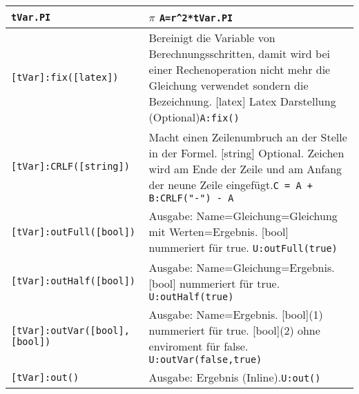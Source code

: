 \begin{table}[h]
	\begin{tabular}{|p{}|p{}|}
		\hline
		\lstinline{tVar.PI} & $\pi$  \newline \lstinline!A=r^2*tVar.PI!\\
		\hline
		\lstinline{[tVar]:fix([latex])} & Bereinigt die Variable von Berechnungsschritten, damit wird bei einer Rechenoperation nicht mehr die Gleichung verwendet sondern die Bezeichnung. [latex] Latex Darstellung (Optional)\newline \lstinline!A:fix()!\\
		\hline
		\lstinline{[tVar]:CRLF([string])} &Macht einen Zeilenumbruch an der Stelle in der Formel. [string] Optional. Zeichen wird am Ende der Zeile und am Anfang der neune Zeile eingefügt.\newline \lstinline!C = A + B:CRLF("-") - A!\\
		\hline
		\lstinline{[tVar]:outFull([bool])} & Ausgabe: Name=Gleichung=Gleichung mit Werten=Ergebnis. [bool] nummeriert für true.  \newline \lstinline!U:outFull(true) !\\
		\hline
		\lstinline{[tVar]:outHalf([bool])} & Ausgabe: Name=Gleichung=Ergebnis. [bool] nummeriert für true.  \newline \lstinline!U:outHalf(true) !\\
		\hline
		\lstinline{[tVar]:outVar([bool],[bool])} & Ausgabe: Name=Ergebnis. [bool](1) nummeriert für true. [bool](2) ohne enviroment für false.  \newline \lstinline!U:outVar(false,true) !\\
		\hline
		\lstinline{[tVar]:out()} & Ausgabe: Ergebnis (Inline).\newline \lstinline!U:out() !\\
		\hline
	\end{tabular}
\end{table}
